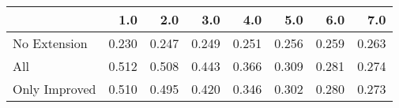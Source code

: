 \begin{tabular}{lrrrrrrr}
\toprule
{} &   1.0 &   2.0 &   3.0 &   4.0 &   5.0 &   6.0 &   7.0 \\
\midrule
No Extension  & 0.230 & 0.247 & 0.249 & 0.251 & 0.256 & 0.259 & 0.263 \\
All           & 0.512 & 0.508 & 0.443 & 0.366 & 0.309 & 0.281 & 0.274 \\
Only Improved & 0.510 & 0.495 & 0.420 & 0.346 & 0.302 & 0.280 & 0.273 \\
\bottomrule
\end{tabular}

